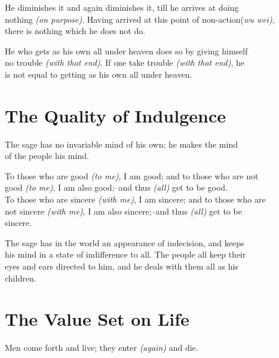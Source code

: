     He diminishes it and again diminishes it, till he arrives at doing\\
    nothing \textit{(on purpose)}. Having arrived at this point of non-action(\textit{wu wei)},\\
    there is nothing which he does not do.\vspace{\baselineskip}
    
    He who gets as his own all under heaven does so by giving himself\\
    no trouble \textit{(with that end)}. If one take trouble \textit{(with that end)}, he\\
    is not equal to getting as his own all under heaven.\vspace{\baselineskip}
    
\section*{The Quality of Indulgence}
    The sage has no invariable mind of his own; he makes the mind\\
    of the people his mind.\vspace{\baselineskip}
    
    To those who are good \textit{(to me)}, I am good; and to those who are not\\
    good \textit{(to me)}, I am also good;--and thus \textit{(all)} get to be good.\\
    To those who are sincere \textit{(with me)}, I am sincere; and to those who are\\
    not sincere \textit{(with me)}, I am also sincere;--and thus \textit{(all)} get to be\\
    sincere.\vspace{\baselineskip}
    
    The sage has in the world an appearance of indecision, and keeps\\
    his mind in a state of indifference to all. The people all keep their\\
    eyes and ears directed to him, and he deals with them all as his\\
    children.\\
    
\section*{The Value Set on Life}
    Men come forth and live; they enter \textit{(again)} and die.\vspace{\baselineskip}
    
